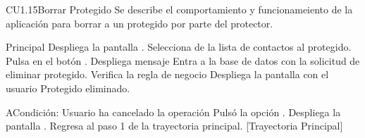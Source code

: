\begin{UseCase}{CU1.15}{Borrar Protegido}{
	Se describe el comportamiento y funcionameiento de la aplicación para borrar a un protegido por parte del protector.}
	\end{UseCase}


	\begin{UCtrayectoria}{Principal}
		\UCpaso[\UCsist] Despliega la pantalla .
		\UCpaso[\UCactor] Selecciona de la lista de contactos al protegido.
		\UCpaso[\UCactor] Pulsa en el botón .
		\UCpaso[\UCsist] Despliega mensaje  
		\UCpaso[\UCsist] Entra a la base de datos con la solicitud de eliminar protegido. 
		\UCpaso[\UCsist] Verifica la regla de negocio  
		\UCpaso[\UCsist] Despliega la pantalla  con el usuario Protegido eliminado.
	\end{UCtrayectoria}


	\begin{UCtrayectoriaA}{A}{Condición: Usuario ha cancelado la operación}
		\UCpaso[\UCactor] Pulsó la opción .
		\UCpaso[\UCsist] Despliega la pantalla .
		\UCpaso[\UCsist] Regresa al paso 1 de la trayectoria principal. [Trayectoria Principal]
	\end{UCtrayectoriaA}

